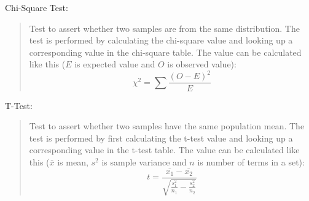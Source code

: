 \begin{framed}
  \hypertarget{metric:chi}{Chi-Square Test:}
  \begin{quote}
    Test to assert whether two samples are from the same distribution. The test is performed by calculating the chi-square value and looking up a corresponding value in the chi-square table. The value can be calculated like this ($E$ is expected value and $O$ is observed value):
    $$\chi^2 = \sum\frac{(O - E)^2}{E}$$
  \end{quote}

  \hypertarget{metric:tt}{T-Test:}
  \begin{quote}
    Test to assert whether two samples have the same population mean. The test is performed by first calculating the t-test value and looking up a corresponding value in the t-test table. The value can be calculated like this ($\bar{x}$ is mean, $s^2$ is sample variance and $n$ is number of terms in a set):
    $$t = \frac{\bar{x_1} - \bar{x_2}}{\sqrt{\frac{s_1^2}{n_1} - \frac{s_2^2}{n_2}}}$$
  \end{quote}
\end{framed}

